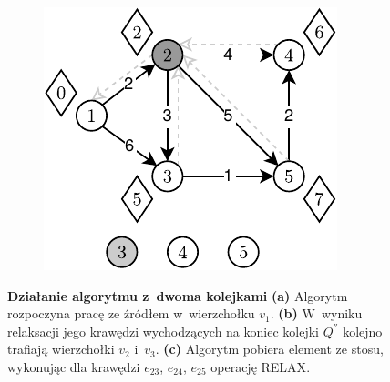 \begin{figure}[!htbp]
\begin{subfigure}[b]{0.28\textwidth}
		\caption{}
	\end{subfigure}
	\quad
	\begin{subfigure}[b]{0.28\textwidth}
		\includegraphics[width=\textwidth]{Chapter_III/GRAPH-GROWTH-2Q-Example/c.pdf}
		\caption{}
	\end{subfigure}
	\caption{\textbf{Działanie algorytmu z~dwoma kolejkami} \textbf{(a)} Algorytm rozpoczyna pracę ze źródłem w~wierzchołku $v_{1}$. \textbf{(b)} W~wyniku relaksacji jego krawędzi wychodzących na koniec kolejki $Q^{''}$ kolejno trafiają wierzchołki $v_{2}$ i~$v_{3}$. \textbf{(c)} Algorytm pobiera element ze stosu, wykonując dla krawędzi $e_{23}$, $e_{24}$, $e_{25}$ operację \textsc{RELAX}. } \label{fig:exampleDQQ1}
\end{figure}

